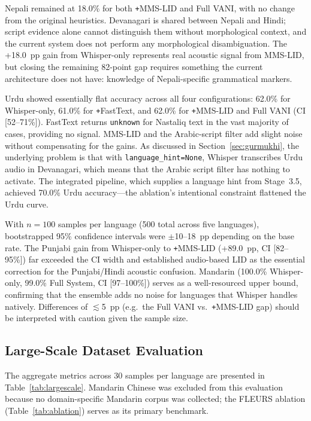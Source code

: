 \documentclass[12pt, onecolumn]{IEEEtran}
\begin{document}
Nepali remained at 18.0\% for both \texttt{+}MMS-LID and Full VANI, with no change from the original heuristics. Devanagari is shared between Nepali and Hindi; script evidence alone cannot distinguish them without morphological context, and the current system does not perform any morphological disambiguation. The +18.0~pp gain from Whisper-only represents real acoustic signal from MMS-LID, but closing the remaining 82-point gap requires something the current architecture does not have: knowledge of Nepali-specific grammatical markers.

Urdu showed essentially flat accuracy across all four configurations: 62.0\% for Whisper-only, 61.0\% for \texttt{+}FastText, and 62.0\% for \texttt{+}MMS-LID and Full VANI (CI [52--71\%]). FastText returns \texttt{unknown} for Nastaliq text in the vast majority of cases, providing no signal. MMS-LID and the Arabic-script filter add slight noise without compensating for the gains. As discussed in Section~\ref{sec:gurmukhi}, the underlying problem is that with \texttt{language\_hint=None}, Whisper transcribes Urdu audio in Devanagari, which means that the Arabic script filter has nothing to activate. The integrated pipeline, which supplies a language hint from Stage~3.5, achieved 70.0\% Urdu accuracy---the ablation's intentional constraint flattened the Urdu curve.

With $n{=}100$ samples per language (500 total across five languages), bootstrapped 95\% confidence intervals were $\pm$10--18~pp depending on the base rate. The Punjabi gain from Whisper-only to \texttt{+}MMS-LID (+89.0~pp, CI [82--95\%]) far exceeded the CI width and established audio-based LID as the essential correction for the Punjabi/Hindi acoustic confusion. Mandarin (100.0\% Whisper-only, 99.0\% Full System, CI [97--100\%]) serves as a well-resourced upper bound, confirming that the ensemble adds no noise for languages that Whisper handles natively. Differences of $\lesssim$5~pp (e.g.\ the Full VANI vs.\ \texttt{+}MMS-LID gap) should be interpreted with caution given the sample size.

\subsection{Large-Scale Dataset Evaluation}
\label{sec:largescale}

The aggregate metrics across 30 samples per language are presented in Table~\ref{tab:largescale}. Mandarin Chinese was excluded from this evaluation because no domain-specific Mandarin corpus was collected; the FLEURS ablation (Table~\ref{tab:ablation}) serves as its primary benchmark.
\end{document}
